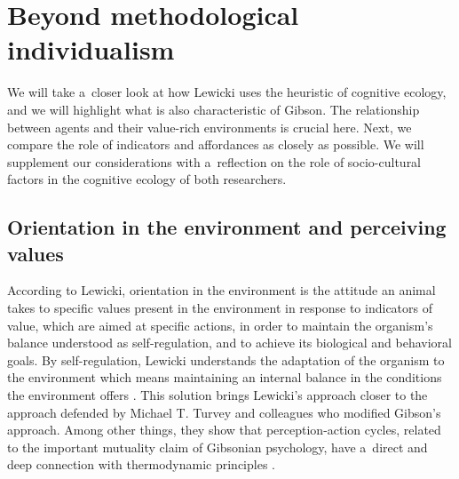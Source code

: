 \documentclass[%
manuscript=article,
year=2024,
volume=77,
doi=10.59203/zfn.77.693,
]{zfn}
\begin{document}
\section{Beyond methodological individualism}

We will take a~closer look at how Lewicki uses the heuristic of cognitive ecology, and we will highlight what is also characteristic of Gibson. The relationship between agents and their value-rich environments is crucial here. Next, we compare the role of indicators and affordances as closely as possible. We will supplement our considerations with a~reflection on the role of socio-cultural factors in the cognitive ecology of both researchers.



\subsection{Orientation in the environment and perceiving values}



According to Lewicki, orientation in the environment is the attitude an animal takes to specific values present in the environment in response to indicators of value, which are aimed at specific actions, in order to maintain the organism's balance understood as self-regulation, and to achieve its biological and behavioral goals. By self-regulation, Lewicki understands the adaptation of the organism to the environment which means maintaining an internal balance in the conditions the environment offers 
\parencite[][p.182]{lewicki_procesy_1960}. %
 This solution brings Lewicki's approach closer to the approach defended by Michael T. Turvey and colleagues who modified Gibson's approach. Among other things, they show that perception-action cycles, related to the important mutuality claim of Gibsonian psychology, have a~direct and deep connection with thermodynamic principles 
\parencite[e.g.,][]{swenson_thermodynamic_1991}.%
\end{document}
